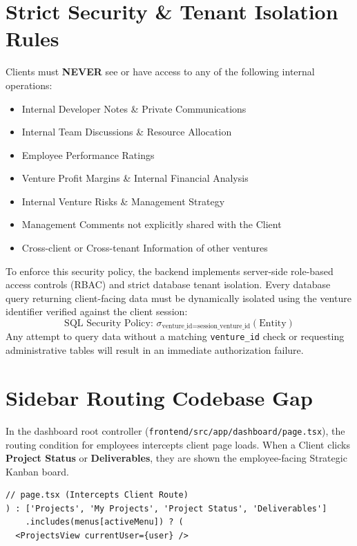 \documentclass[11pt,a4paper]{article}
\begin{document}
\newpage
\section{Strict Security \& Tenant Isolation Rules}
\begin{tcolorbox}[colback=red!5,colframe=red!60!black,arc=6pt,boxrule=1.5pt,title=CRITICAL SECURITY POLICY]
Clients must \textbf{NEVER} see or have access to any of the following internal operations:
\begin{itemize}
    \item Internal Developer Notes \& Private Communications
    \item Internal Team Discussions \& Resource Allocation
    \item Employee Performance Ratings
    \item Venture Profit Margins \& Internal Financial Analysis
    \item Internal Venture Risks \& Management Strategy
    \item Management Comments not explicitly shared with the Client
    \item Cross-client or Cross-tenant Information of other ventures
\end{itemize}
\end{tcolorbox}
To enforce this security policy, the backend implements server-side role-based access controls (RBAC) and strict database tenant isolation. Every database query returning client-facing data must be dynamically isolated using the venture identifier verified against the client session:
\begin{equation}
\text{SQL Security Policy: } \sigma_{\text{venture\_id} = \text{session\_venture\_id}}(\text{Entity})
\end{equation}
Any attempt to query data without a matching \texttt{venture\_id} check or requesting administrative tables will result in an immediate authorization failure.

\section{Sidebar Routing Codebase Gap}
In the dashboard root controller (\texttt{frontend/src/app/dashboard/page.tsx}), the routing condition for employees intercepts client page loads. When a Client clicks \textbf{Project Status} or \textbf{Deliverables}, they are shown the employee-facing Strategic Kanban board.
\begin{tcolorbox}[colback=brandpurple!5,colframe=brandpurple!20,arc=6pt,boxrule=1pt,title=Routing Bug Snippet]
\begin{verbatim}
// page.tsx (Intercepts Client Route)
) : ['Projects', 'My Projects', 'Project Status', 'Deliverables']
    .includes(menus[activeMenu]) ? (
  <ProjectsView currentUser={user} />
\end{verbatim}
\end{tcolorbox}
\end{document}
